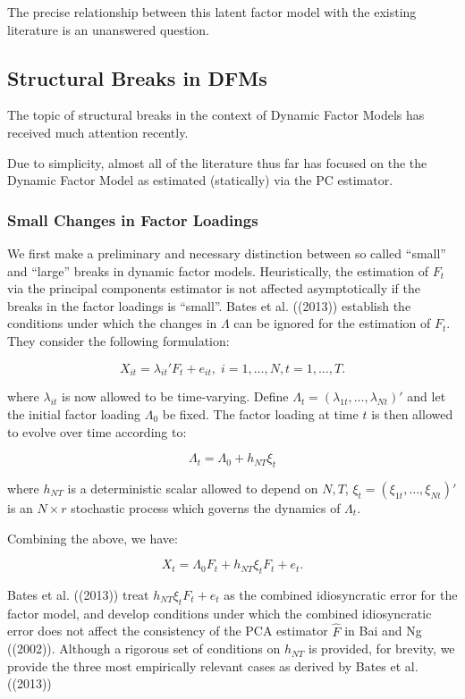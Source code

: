 \documentclass[
]{article}
\begin{document}
The precise relationship between this latent factor model with the
existing literature is an unanswered question.

\hypertarget{structural-breaks-in-dfms}{%
\subsection{Structural Breaks in DFMs}\label{structural-breaks-in-dfms}}

The topic of structural breaks in the context of Dynamic Factor Models
has received much attention recently.

Due to simplicity, almost all of the literature thus far has focused on
the the Dynamic Factor Model as estimated (statically) via the PC
estimator.

\hypertarget{small-changes-in-factor-loadings}{%
\subsubsection{Small Changes in Factor
Loadings}\label{small-changes-in-factor-loadings}}

We first make a preliminary and necessary distinction between so called
``small'' and ``large'' breaks in dynamic factor models. Heuristically,
the estimation of \(F_t\) via the principal components estimator is not
affected asymptotically if the breaks in the factor loadings is
``small''. Bates et al. ((2013)) establish the conditions under which
the changes in \(\Lambda\) can be ignored for the estimation of \(F_t\).
They consider the following formulation:

\[
X_{it} = \lambda_{it}' F_t + e_{it}, \; i = 1, \dots, N, t = 1, \dots, T.
\]

where \(\lambda_{it}\) is now allowed to be time-varying. Define
\(\Lambda_t = (\lambda_{1t}, \dots, \lambda_{Nt})'\) and let the initial
factor loading \(\Lambda_0\) be fixed. The factor loading at time \(t\)
is then allowed to evolve over time according to:

\[
\Lambda_t = \Lambda_0 + h_{NT}\xi_t
\]

where \(h_{NT}\) is a deterministic scalar allowed to depend on
\(N, T\), \(\xi_t = (\xi_{1t}, \dots, \xi_{Nt})'\) is an \(N \times r\)
stochastic process which governs the dynamics of \(\Lambda_t\).

Combining the above, we have:

\[
X_{t} = \Lambda_0 F_t + h_{NT}\xi_t F_t + e_{t}.
\]

Bates et al. ((2013)) treat \(h_{NT}\xi_t F_t + e_{t}\) as the combined
idiosyncratic error for the factor model, and develop conditions under
which the combined idiosyncratic error does not affect the consistency
of the PCA estimator \(\widehat{F}\) in Bai and Ng ((2002)). Although a
rigorous set of conditions on \(h_{NT}\) is provided, for brevity, we
provide the three most empirically relevant cases as derived by Bates et
al. ((2013))
\end{document}
